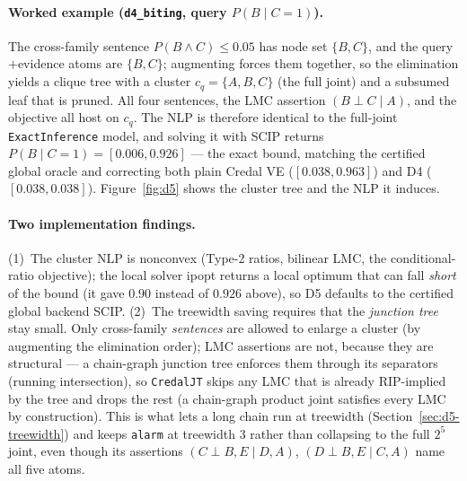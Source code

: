 \documentclass[11pt]{article}
\begin{document}
\paragraph{Worked example (\texttt{d4\_biting}, query $P(B\mid C{=}1)$).} The cross-family
sentence $P(B\land C)\le 0.05$ has node set $\{B,C\}$, and the query$+$evidence atoms are
$\{B,C\}$; augmenting forces them together, so the elimination yields a clique tree with a
cluster $c_q{=}\{A,B,C\}$ (the full joint) and a subsumed leaf that is pruned. All four
sentences, the LMC assertion $(B\perp C\mid A)$, and the objective all host on $c_q$. The NLP
is therefore identical to the full-joint \texttt{ExactInference} model, and solving it with
SCIP returns $P(B\mid C{=}1)=[0.006,0.926]$ --- the exact bound, matching the certified global
oracle and correcting both plain Credal VE ($[0.038,0.963]$) and D4 ($[0.038,0.038]$).
Figure~\ref{fig:d5} shows the cluster tree and the NLP it induces.

\paragraph{Two implementation findings.} (1)~The cluster NLP is nonconvex (Type-2 ratios,
bilinear LMC, the conditional-ratio objective); the local solver ipopt returns a local
optimum that can fall \emph{short} of the bound (it gave $0.90$ instead of $0.926$ above), so
D5 defaults to the certified global backend SCIP. (2)~The treewidth saving requires that the
\emph{junction tree} stay small. Only cross-family \emph{sentences} are allowed to enlarge a
cluster (by augmenting the elimination order); LMC assertions are not, because they are
structural --- a chain-graph junction tree enforces them through its separators (running
intersection), so \texttt{CredalJT} skips any LMC that is already RIP-implied by the tree and
drops the rest (a chain-graph product joint satisfies every LMC by construction). This is what
lets a long chain run at treewidth (Section~\ref{sec:d5-treewidth}) and keeps \texttt{alarm} at
treewidth $3$ rather than collapsing to the full $2^5$ joint, even though its assertions
$(C\perp B,E\mid D,A)$, $(D\perp B,E\mid C,A)$ name all five atoms.
\end{document}

